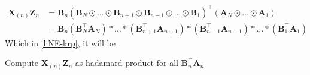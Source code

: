 \documentclass{article}
\newcommand{\mat}[1]{\mathbf{#1}}
\begin{document}
\begin{align}
  \mat{X}_{(n)}\mat{Z}_n &= \mat{B}_n(\mat{B}_N \odot \dots \odot \mat{B}_{n+1} \odot \mat{B}_{n-1} \odot \dots \odot \mat{B}_1)^\top(\mat{A}_N \odot \dots \odot \mat{A}_1) \nonumber \\
 &= \mat{B}_n(\mat{B}_N^\top\mat{A}_N) \ast \dots \ast (\mat{B}_{n+1}^\top\mat{A}_{n+1}) \ast (\mat{B}_{n-1}^\top\mat{A}_{n-1}) \ast \dots \ast (\mat{B}_1^\top\mat{A}_1)  \nonumber 
\end{align}
Which in \cref{l:NE-krp}, it will be 
\begin{algorithm}[!ht]
  \begin{algorithmic}
    \State Compute $\mat{X}_{(n)}\mat{Z}_n$ as hadamard product for all $\mat{B}_n^\top\mat{A}_n$
  \end{algorithmic}
\end{algorithm}
\end{document}
